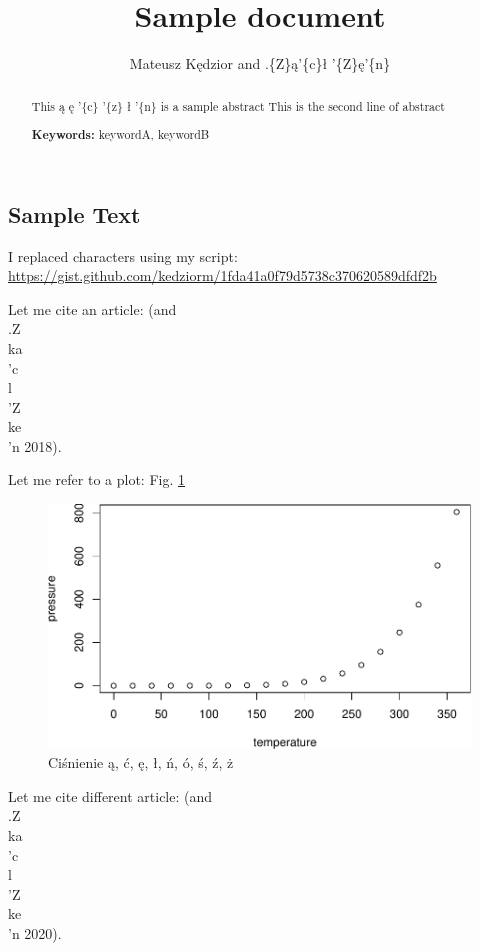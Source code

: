 \documentclass[]{article}
\title{Sample document}
\author{Mateusz K\k{e}dzior and .\{Z\}\k{a}'\{c\}\l{} '\{Z\}\k{e}'\{n\}}
\date{}
\begin{document}
\maketitle
\begin{abstract}
This \k{a} \k{e} '\{c\} '\{z\} \l{} '\{n\} is a sample abstract
\newline This is the second line of abstract \par \textbf{Keywords:}
keywordA, keywordB
\end{abstract}

{
\setcounter{tocdepth}{2}
\tableofcontents
}
\subsection{Sample Text}\label{sample-text}

I replaced characters using my script:
\url{https://gist.github.com/kedziorm/1fda41a0f79d5738c370620589dfdf2b}

Let me cite an article: (and\\
.Z\\
ka\\
'c\\
l\\
'Z\\
ke\\
'n 2018).

Let me refer to a plot: Fig. \ref{fig:pressure}

\begin{figure}

{\centering \includegraphics[width=0.5\linewidth]{accented_chars_minimal_pdfDocument2_files/figure-latex/pressure-1} 

}

\caption{Ci\'{s}nienie \k{a}, \'{c}, \k{e}, \l{}, \'{n}, \'{o}, \'{s}, \'{z}, \.{z}}\label{fig:pressure}
\end{figure}

Let me cite different article: (and\\
.Z\\
ka\\
'c\\
l\\
'Z\\
ke\\
'n 2020).
\end{document}
